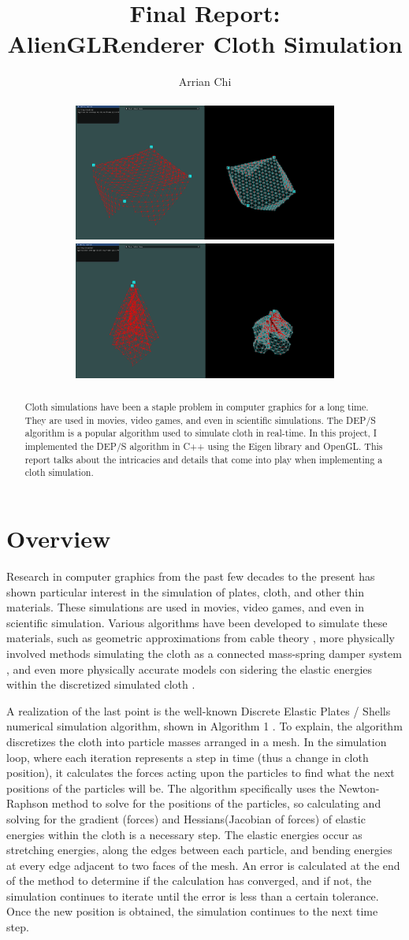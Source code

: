 \documentclass[letterpaper, 10 pt, conference]{ieeeconf}  %
\title{\LARGE \bf
Final Report: \\ 
\Large AlienGLRenderer Cloth Simulation
}
\author{Arrian Chi%
\\
\\
\includegraphics[width=8.7cm]{cloth1.PNG} \> \includegraphics[width=8.7cm]{cloth2.PNG} 
}
\begin{document}


\maketitle
\thispagestyle{empty}
\pagestyle{empty}



\begin{abstract}

Cloth simulations have been a staple problem in computer graphics for a long time. They are used in movies, video games, and even in scientific simulations. The DEP/S algorithm is a popular algorithm used to simulate cloth in real-time. In this project, I implemented the DEP/S algorithm in C++ using the Eigen library and OpenGL. This report talks about the intricacies and details that come into play when implementing a cloth simulation. 

\end{abstract}
\section{Overview}

Research in computer graphics from the past few decades to the present \cite{baraff1998large} \cite{Grinspun2003discrete} \cite{Tamstorf2013discrete} has shown particular interest in the simulation of plates, cloth, and other thin materials. These simulations are used in movies, video games, and even in scientific simulation. Various algorithms have been developed to simulate these materials, such as geometric approximations from cable theory \cite{weil1986synthesis}, more physically involved methods simulating the cloth as a connected mass-spring damper system  \cite{provot1995deformation}, and even more physically accurate models con sidering the elastic energies within the discretized simulated cloth \cite{terzopoulos1987elastically}. 

A realization of the last point is the well-known Discrete Elastic Plates / Shells numerical simulation algorithm, shown in Algorithm 1 \cite{jawedlimdiscrete} \cite{baraff1998large}. To explain, the algorithm discretizes the cloth into particle masses arranged in a mesh. In the simulation loop, where each iteration represents a step in time (thus a change in cloth position), it calculates the forces acting upon the particles to find what the next positions of the particles will be. The algorithm specifically uses the Newton-Raphson method to solve for the positions of the particles, so calculating and solving for the gradient (forces) and Hessians(Jacobian of forces) of elastic energies within the cloth is a necessary step. The elastic energies occur as stretching energies, along the edges between each particle, and bending energies at every edge adjacent to two faces of the mesh. An error is calculated at the end of the method to determine if the calculation has converged, and if not, the simulation continues to iterate until the error is less than a certain tolerance. Once the new position is obtained, the simulation continues to the next time step.
\end{document}
